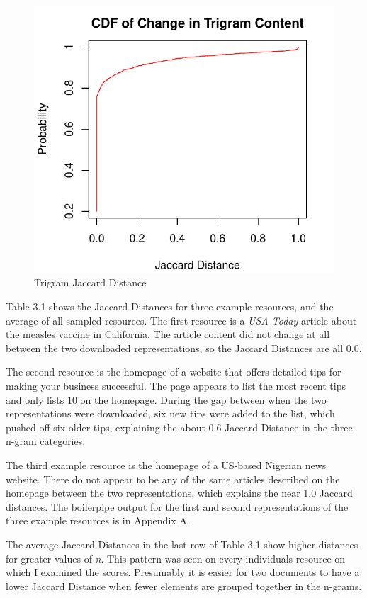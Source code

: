 \documentclass[a4paper,12pt]{article}
\begin{document}
\begin{figure}[H]
    \centering
    \includegraphics{stats/q1_trigrams.pdf}
    \caption{Trigram Jaccard Distance}
\end{figure}

Table 3.1 shows the Jaccard Distances for three example resources, and the average of all sampled resources.
The first resource is a \emph{USA Today} article about the measles vaccine in California. The article content
did not change at all between the two downloaded representations, so the Jaccard Distances are all 0.0.

The
second resource is the homepage of a website that offers detailed tips for making your business successful.
The page appears to list the most recent tips and only lists 10 on the homepage. During the gap between when
the two representations were downloaded, six new tips were added to the list, which pushed off six older tips,
explaining the about 0.6 Jaccard Distance in the three n-gram categories.

The third example resource is the homepage of a US-based Nigerian news website. There do not appear to be any
of the same articles described on the homepage between the two representations, which explains the near 1.0
Jaccard distances. The boilerpipe output for the first and second representations of the three example
resources is in Appendix A.

The average Jaccard Distances in the last row of Table 3.1 show higher distances for greater values of
\emph{n}. This pattern was seen on every individuals resource on which I examined the scores.
Presumably it is easier for two documents to have a lower Jaccard Distance when fewer elements are
grouped together in the n-grams.
\end{document}
